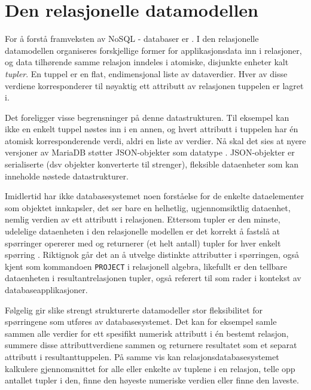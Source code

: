 \section{Den relasjonelle datamodellen}

For å forstå framveksten av NoSQL - databaser er . I den relasjonelle datamodellen organiseres forskjellige former for applikasjonsdata inn i relasjoner, og data tilhørende samme relasjon inndeles i atomiske, disjunkte enheter kalt \emph{tupler}. En tuppel er en flat, endimensjonal liste av dataverdier. Hver av disse verdiene korresponderer til nøyaktig ett attributt av relasjonen tuppelen er lagret i.

Det foreligger visse begrensninger på denne datastrukturen. Til eksempel kan ikke en enkelt tuppel nøstes inn i en annen, og hvert attributt i tuppelen har én atomisk korresponderende verdi, aldri en liste av verdier. Nå skal det sies at nyere versjoner av MariaDB støtter JSON-objekter som datatype \citep{mariadb}. JSON-objekter er serialiserte (dsv objekter konverterte til strenger), fleksible dataenheter som kan inneholde nøstede datastrukturer.

Imidlertid har ikke databasesystemet noen forståelse for de enkelte dataelementer som objektet innkapsler, det ser bare en helhetlig, ugjennomsiktlig dataenhet, nemlig verdien av ett attributt i relasjonen. Ettersom tupler er den minste, udelelige dataenheten i den relasjonelle modellen er det korrekt å fastslå at spørringer opererer med og returnerer (et helt antall) tupler for hver enkelt spørring \citep{sadalage2013}. Riktignok går det an å utvelge distinkte attributter i spørringen, også kjent som kommandoen \texttt{PROJECT} i relasjonell algebra, likefullt er den tellbare dataenheten i resultantrelasjonen tupler, også referert til som rader i kontekst av databaseapplikasjoner.

Følgelig gir slike strengt strukturerte datamodeller stor fleksibilitet for spørringene som utføres av databasesystemet. Det kan for eksempel samle sammen alle verdier for ett spesifikt numerisk attributt i én bestemt relasjon, summere disse  attributtverdiene sammen og returnere resultatet som et separat attributt i resultanttuppelen. På samme vis kan relasjonsdatabasesystemet kalkulere gjennomsnittet for alle eller enkelte av tuplene i en relasjon, telle opp antallet tupler i den, finne den høyeste numeriske verdien eller finne den laveste.

